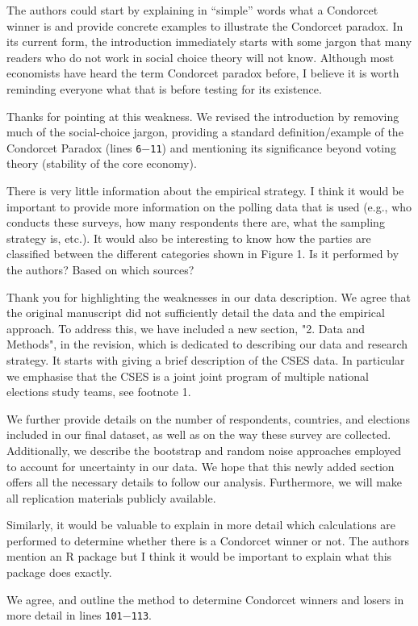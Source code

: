 \documentclass[a4paper, 12pt]{scrartcl}
\theoremstyle{break}
\newenvironment{changes}{\par\color{violet}\par\addvspace{\baselineskip}}{\par\addvspace{\baselineskip}}
\begin{document}
\begin{changes}
The authors could start by explaining in “simple” words what a Condorcet winner is and provide concrete examples to illustrate the Condorcet paradox. In its current form, the introduction immediately starts with some jargon that many readers who do not work in social choice theory will not know. Although most economists have heard the term Condorcet paradox before, I believe it is worth reminding everyone what that is before testing for its existence.
\end{changes}

Thanks for pointing at this weakness. We revised the introduction by removing much of the social-choice jargon, providing a standard definition/example of the Condorcet Paradox (lines \texttt{6$-$11}) and mentioning its significance beyond voting theory (stability of the core economy). 

\begin{changes}
There is very little information about the empirical strategy. I think it would be important to provide more information on the polling data that is used (e.g., who conducts these surveys, how many respondents there are, what the sampling strategy is, etc.). It would also be interesting to know how the parties are classified between the different categories shown in Figure 1. Is it performed by the authors? Based on which sources?
\end{changes}

Thank you for highlighting the weaknesses in our data description. We agree that the original manuscript did not sufficiently detail the data and the empirical approach. To address this, we have included a new section, "2. Data and Methods", in the revision, which is dedicated to describing our data and research strategy. It starts with giving a brief description of the CSES data. In particular we emphasise that the CSES is a joint joint program of multiple national elections study teams, see footnote 1.

We further provide details on the number of respondents, countries, and elections included in our final dataset, as well as on the way these survey are collected. Additionally, we describe the bootstrap and random noise approaches employed to account for uncertainty in our data. We hope that this newly added section offers all the necessary details to follow our analysis. Furthermore, we will make all replication materials publicly available.

\begin{changes}
Similarly, it would be valuable to explain in more detail which calculations are performed to determine whether there is a Condorcet winner or not. The authors mention an R package but I think it would be important to explain what this package does exactly.
\end{changes}
We agree, and outline the method to determine Condorcet winners and losers in more detail in lines \texttt{101$-$113}.
\end{document}
